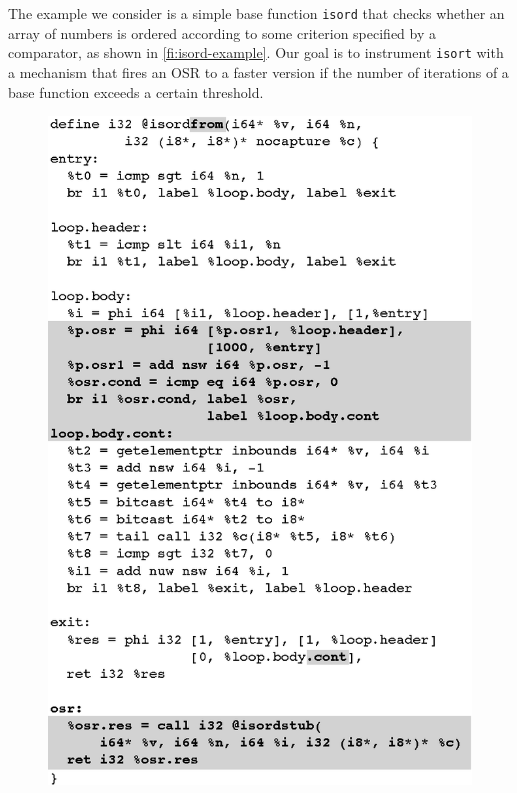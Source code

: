 The example we consider is a simple base function {\tt isord} that checks whether an array of numbers is ordered according to some criterion specified by a comparator, as shown in \myfigure\ref{fi:isord-example}. Our goal is to instrument {\tt isort} with a mechanism that fires an OSR to a faster version if the number of iterations of a base function exceeds a certain threshold.


\ifdefined\noauthorea
\begin{figure}[t]
\begin{center}
\includegraphics[width=0.9\columnwidth]{figures/isordfrom/isordfrom.eps}
\caption{\protect}
\end{center}
\end{figure}
\fi

